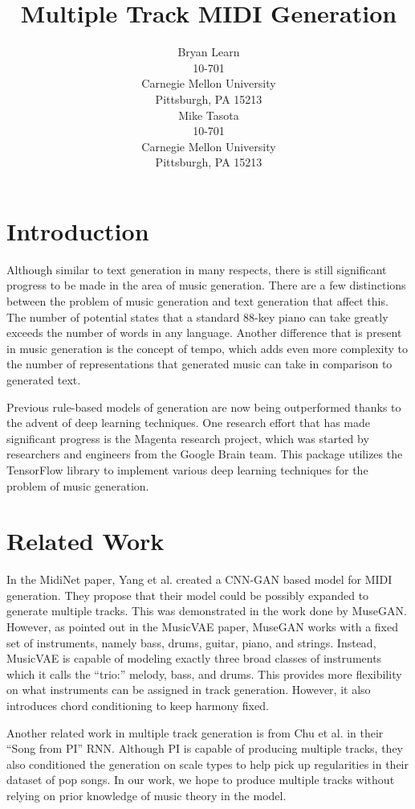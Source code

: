 \documentclass{article}
\title{Multiple Track MIDI Generation}
\author{
  Bryan Learn\\
  10-701\\
  Carnegie Mellon University\\
  Pittsburgh, PA 15213\\
  \And
  Mike Tasota\\
  10-701\\
  Carnegie Mellon University\\
  Pittsburgh, PA 15213\\
}
\begin{document}

\maketitle


\section{Introduction}

Although similar to text generation in many respects, there is still significant progress to be made in the area of music generation. There are a few distinctions between the problem of music generation and text generation that affect this. The number of potential states that a standard 88-key piano can take greatly exceeds the number of words in any language. Another difference that is present in music generation is the concept of tempo, which adds even more complexity to the number of representations that generated music can take in comparison to generated text.

Previous rule-based models of generation are now being outperformed thanks to the advent of deep learning techniques. One research effort that has made significant progress is the Magenta research project, which was started by researchers and engineers from the Google Brain team. This package utilizes the TensorFlow library to implement various deep learning techniques for the problem of music generation.


\section{Related Work}
In the MidiNet paper, Yang et al. created a CNN-GAN based model for MIDI generation. They propose that their model could be possibly expanded to generate multiple tracks. This was demonstrated in the work done by MuseGAN. However, as pointed out in the MusicVAE paper, MuseGAN works with a fixed set of instruments, namely bass, drums, guitar, piano, and strings. Instead, MusicVAE is capable of modeling exactly three broad classes of instruments which it calls the “trio:” melody, bass, and drums. This provides more flexibility on what instruments can be assigned in track generation. However, it also introduces chord conditioning to keep harmony fixed.

Another related work in multiple track generation is from Chu et al. in their “Song from PI” RNN. Although PI is capable of producing multiple tracks, they also conditioned the generation on scale types to help pick up regularities in their dataset of pop songs. In our work, we hope to produce multiple tracks without relying on prior knowledge of music theory in the model.
\end{document}
